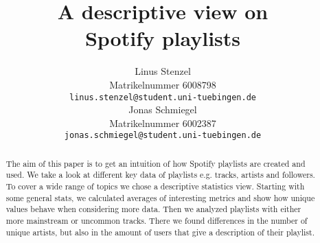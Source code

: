 \documentclass{article}
\title{A descriptive view on\\ Spotify playlists}
\author{
  Linus Stenzel\\
  Matrikelnummer 6008798\\
  \texttt{linus.stenzel@student.uni-tuebingen.de} \\
  \And
  Jonas Schmiegel\\
  Matrikelnummer 6002387\\
  \texttt{jonas.schmiegel@student.uni-tuebingen.de} \\
}
\begin{document}
\maketitle

\begin{abstract}
  The aim of this paper is to get an intuition of how Spotify playlists are created and used. We take a look at different key data of playlists e.g. tracks, artists and followers. To cover a wide range of topics we chose a descriptive statistics view. Starting with some general stats, we calculated averages of interesting metrics and show how unique values behave when considering more data. Then we analyzed playlists with either more mainstream or uncommon tracks. There we found differences in the number of unique artists, but also in the amount of users that give a description of their playlist.
  
\end{abstract}









\end{document}
